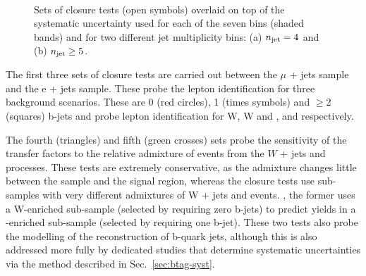 \begin{figure}[h!]
\begin{center}
     \\
    \caption{Sets of closure tests (open symbols) overlaid on top of
      the systematic uncertainty used for each of the seven \scalht
      bins (shaded bands) and for two different jet
      multiplicity bins: (a) $n_{\text{jet}} = 4$ and (b) $n_{\text{jet}} \geq5$.}
    \label{fig:closure}
  \end{center} 
\end{figure}

The first three sets of closure tests are carried out between the $\mu$ 
+ jets sample and the e + jets sample. These probe the lepton 
identification for three background scenarios. These are 0 (red circles), 
1 (times symbols) and $\geq$2 (squares) b-jets and probe lepton identification 
for W, W and \ttbar, and \ttbar respectively.

The fourth (triangles) and fifth (green crosses) sets probe the
sensitivity of the transfer factors to the relative admixture of
events from the $W$ + jets and \ttbar processes. These tests are
extremely conservative, as the admixture changes little between the
\mj sample and the signal region, whereas the closure tests use
sub-samples with very different admixtures of W + jets and \ttbar
events. \eg, the former uses a W-enriched sub-sample (selected by
requiring zero b-jets) to predict yields in a \ttbar-enriched
sub-sample (selected by requiring one b-jet). These two tests also
probe the modelling of the reconstruction of b-quark jets, although
this is also addressed more fully by dedicated studies that determine
systematic uncertainties via the method described in
Sec.~\ref{sec:btag-syst}.

